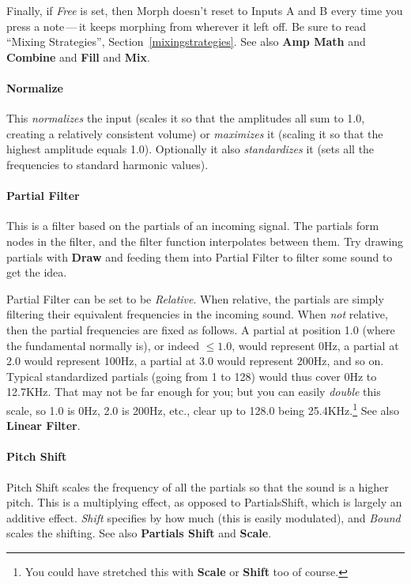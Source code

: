 \documentclass{article}
\begin{document}
Finally, if {\it Free} is set, then Morph doesn't reset to Inputs A and B every time you press a note\,---\,it keeps morphing from wherever it left off.  Be sure to read ``Mixing Strategies'', Section~\ref{mixingstrategies}.  See also {\bf Amp Math} and  {\bf Combine} and {\bf Fill} and {\bf Mix}.

\paragraph{Normalize} This {\it normalizes} the input (scales it so that the amplitudes all sum to 1.0, creating a relatively consistent volume) or {\it maximizes} it (scaling it so that the highest amplitude equals 1.0).  Optionally it also {\it standardizes} it (sets all the frequencies to standard harmonic values).

\paragraph{Partial Filter} This is a filter based on the partials of an incoming signal.  The partials form nodes in the filter, and the filter function interpolates between them.  Try drawing partials with {\bf Draw} and feeding them into Partial Filter to filter some sound to get the idea.  

Partial Filter can be set to be {\it Relative}.  When relative, the partials are simply filtering their equivalent frequencies in the incoming sound.  When {\it not} relative, then the partial frequencies are fixed as follows.  A partial at position 1.0 (where the fundamental normally is), or indeed \(\leq 1.0\), would represent 0Hz, a partial at 2.0 would represent 100Hz, a partial at 3.0 would represent 200Hz, and so on.  Typical standardized partials (going from 1 to 128) would thus cover 0Hz to 12.7KHz.  That may not be far enough for you; but you can easily {\it double} this scale, so 1.0 is 0Hz, 2.0 is 200Hz, etc., clear up to 128.0 being 25.4KHz.\footnote{You could have stretched this with {\bf Scale} or {\bf Shift} too of course.}  See also {\bf Linear Filter}.

\paragraph{Pitch Shift} Pitch Shift scales the frequency of all the partials so that the sound is a higher pitch.  This is a multiplying effect, as opposed to PartialsShift, which is largely an additive effect.    {\it Shift} specifies by how much (this is easily modulated), and {\it Bound} scales the shifting.  See also {\bf Partials Shift} and  {\bf Scale}.
\end{document}
